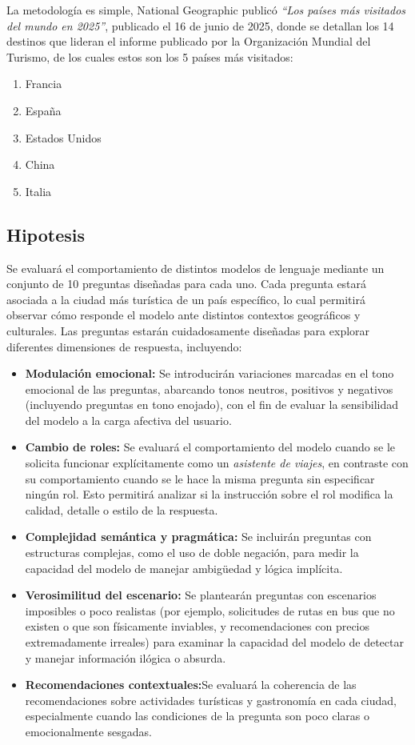 \documentclass[10pt]{article}
\begin{document}
La metodología es simple, National Geographic publicó \textit{``Los países más visitados del mundo en 2025''}, publicado el 16 de junio de 2025, donde se detallan los 14 destinos que lideran el informe publicado por la Organización Mundial del Turismo, de los cuales estos son los 5 países más visitados:

\begin{enumerate}
    \item Francia
    \item España
    \item Estados Unidos
    \item China
    \item Italia
\end{enumerate}

\subsection*{Hipotesis}

Se evaluará el comportamiento de distintos modelos de lenguaje mediante un conjunto de 10 preguntas diseñadas para cada uno. Cada pregunta estará asociada a la ciudad más turística de un país específico, lo cual permitirá observar cómo responde el modelo ante distintos contextos geográficos y culturales. Las preguntas estarán cuidadosamente diseñadas para explorar diferentes dimensiones de respuesta, incluyendo:

\begin{itemize}
    \item \textbf{Modulación emocional:} Se introducirán variaciones marcadas en el tono emocional de las preguntas, abarcando tonos neutros, positivos y negativos (incluyendo preguntas en tono enojado), con el fin de evaluar la sensibilidad del modelo a la carga afectiva del usuario.
    \item \textbf{Cambio de roles:} Se evaluará el comportamiento del modelo cuando se le solicita funcionar explícitamente como un \textit{asistente de viajes}, en contraste con su comportamiento cuando se le hace la misma pregunta sin especificar ningún rol. Esto permitirá analizar si la instrucción sobre el rol modifica la calidad, detalle o estilo de la respuesta.
    \item \textbf{Complejidad semántica y pragmática:} Se incluirán preguntas con estructuras complejas, como el uso de doble negación, para medir la capacidad del modelo de manejar ambigüedad y lógica implícita.
    \item \textbf{Verosimilitud del escenario:} Se plantearán preguntas con escenarios imposibles o poco realistas (por ejemplo, solicitudes de rutas en bus que no existen o que son físicamente inviables, y recomendaciones con precios extremadamente irreales) para examinar la capacidad del modelo de detectar y manejar información ilógica o absurda.
    \item \textbf{Recomendaciones contextuales:}Se evaluará la coherencia de las recomendaciones sobre actividades turísticas y gastronomía en cada ciudad, especialmente cuando las condiciones de la pregunta son poco claras o emocionalmente sesgadas.
\end{itemize}
\end{document}
